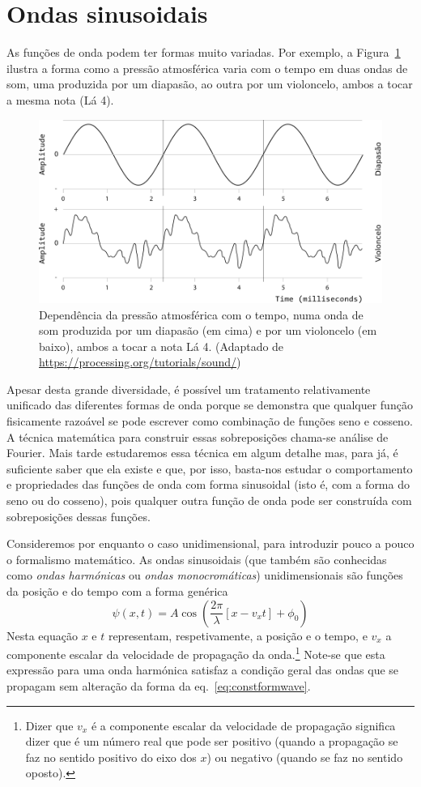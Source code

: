 \section{Ondas sinusoidais}\label{sec:hamonicwaves}
As funções de onda podem ter formas muito variadas. Por exemplo, a
Figura~\ref{fig:20-cello} ilustra a forma como a pressão atmosférica varia com o
tempo em duas ondas de som, uma produzida por um diapasão, ao outra por um
violoncelo, ambos a tocar a mesma nota (Lá 4).
\begin{figure}[htb]
{\centering
\includegraphics[width=0.5\linewidth]{figs/f20-cello.png}\par
}
\caption{Dependência da pressão atmosférica com o tempo, numa onda de som
produzida por um diapasão (em cima) e por um violoncelo (em baixo), ambos a
tocar a nota Lá 4. (Adaptado de
\protect\url{https://processing.org/tutorials/sound/})\label{fig:20-cello}}
\end{figure}
Apesar desta grande diversidade, é possível um tratamento relativamente
unificado das diferentes formas de onda porque se demonstra que qualquer função
fisicamente razoável se pode escrever como combinação de funções seno e cosseno.
A técnica matemática para construir essas sobreposições chama-se análise de
Fourier. Mais tarde estudaremos essa técnica em algum detalhe mas, para já, é
suficiente saber que ela existe e que, por isso, basta-nos estudar o
comportamento e propriedades das funções de onda com forma sinusoidal (isto é,
com a forma do seno ou do cosseno), pois qualquer outra função de onda pode ser
construída com sobreposições dessas funções.

Consideremos por enquanto o caso unidimensional, para introduzir pouco a pouco o
formalismo matemático. As ondas sinusoidais (que também são conhecidas como
\emph{ondas harmónicas} ou \emph{ondas monocro\-máticas}) unidimensionais são
funções da posição e do tempo com a forma genérica
\begin{equation}\label{eq:hwav}
    \psi(x,t)=A\cos\left(\frac{2\pi}{\lambda}\left[x-v_xt\right]+
            \phi_0\right)
\end{equation}
Nesta equação $x$ e $t$ representam, respetivamente, a posição e o tempo, e
$v_x$ a componente escalar da velocidade de propagação da onda.\footnote{Dizer
que $v_x$ é a componente escalar da velocidade de propagação significa dizer que
é um número real que pode ser positivo (quando a propagação se faz no sentido
positivo do eixo dos $x$) ou negativo (quando se faz no sentido oposto).}
Note-se que esta expressão para uma onda harmónica satisfaz a condição geral das
ondas que se propagam sem alteração da forma da eq.~\eqref{eq:constformwave}.

